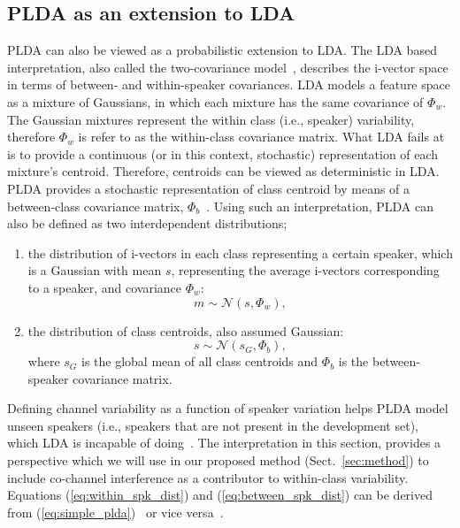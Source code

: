 \documentclass[journal]{IEEEtran}
\begin{document}
\subsection{PLDA as an extension to LDA}
\label{sec:twocov}
PLDA can also be viewed as a probabilistic extension to LDA. 
The LDA based interpretation, also called the two-covariance model~\cite{niko_twocov,sizov2014unifying}, describes the i-vector space in terms of between- and within-speaker covariances. 
LDA models a feature space as a mixture of Gaussians, in which each mixture has the same covariance of $\Phi_w$. 
The Gaussian mixtures represent the within class (i.e., speaker) variability, therefore $\Phi_w$ is refer to as the within-class covariance matrix. 
What LDA fails at is to provide a continuous (or in this context, stochastic) representation of each mixture's centroid. 
Therefore, centroids can be viewed as deterministic in LDA. 
PLDA provides a stochastic representation of class centroid by means of a between-class covariance matrix, $\Phi_b$~\cite{ioffePLDA2006}. 
Using such an interpretation, PLDA can also be defined as two interdependent distributions; 
\begin{enumerate}
	\item the distribution of i-vectors in each class representing a certain speaker, which is a Gaussian with mean $s$, representing the average i-vectors corresponding to a speaker, and covariance $\Phi_w$:
	\begin{equation}
		\label{eq:within_spk_dist}
		m \sim \mathcal{N} (s,\Phi_w),
	\end{equation}
\item the distribution of class centroids, also assumed Gaussian:
	\begin{equation}
		\label{eq:between_spk_dist}
		s \sim \mathcal{N} (s_G,\Phi_b),
	\end{equation}
	where $s_G$ is the global mean of all class centroids and $\Phi_b$ is the between-speaker covariance matrix. 
\end{enumerate}

Defining channel variability as a function of speaker variation helps PLDA model unseen speakers (i.e., speakers that are not present in the development set), which LDA is incapable of doing~\cite{ioffePLDA2006}. 
The interpretation in this section, provides a perspective which we will use in our proposed method (Sect.~\ref{sec:method}) to include co-channel interference as a contributor to within-class variability. 
Equations (\ref{eq:within_spk_dist}) and (\ref{eq:between_spk_dist}) can be derived from (\ref{eq:simple_plda})~\cite{sizov2014unifying} or vice versa~\cite{ioffePLDA2006}. 
 
\end{document}
